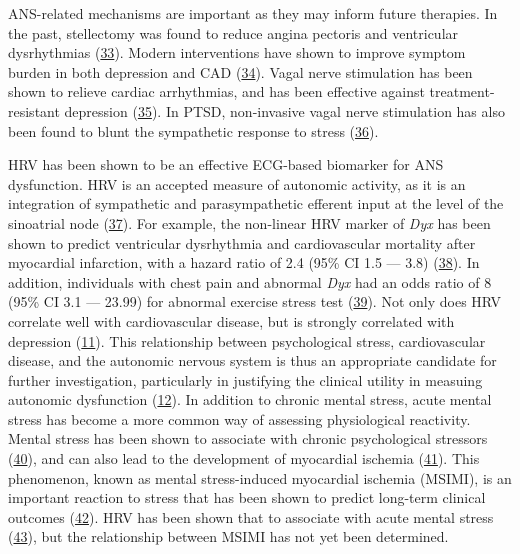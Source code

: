 \documentclass[
  11pt,
  openany]{book}
\begin{document}
ANS-related mechanisms are important as they may inform future therapies.
In the past, stellectomy was found to reduce angina pectoris and ventricular dysrhythmias (\protect\hyperlink{ref-Schwartz2017a}{33}).
Modern interventions have shown to improve symptom burden in both depression and CAD (\protect\hyperlink{ref-Penninx2017}{34}).
Vagal nerve stimulation has been shown to relieve cardiac arrhythmias, and has been effective against treatment-resistant depression (\protect\hyperlink{ref-Zhang2011a}{35}).
In PTSD, non-invasive vagal nerve stimulation has also been found to blunt the sympathetic response to stress (\protect\hyperlink{ref-Gurel2019a}{36}).

HRV has been shown to be an effective ECG-based biomarker for ANS dysfunction.
HRV is an accepted measure of autonomic activity, as it is an integration of sympathetic and parasympathetic efferent input at the level of the sinoatrial node (\protect\hyperlink{ref-Saul1990}{37}).
For example, the non-linear HRV marker of \emph{Dyx} has been shown to predict ventricular dysrhythmia and cardiovascular mortality after myocardial infarction, with a hazard ratio of 2.4 (95\% CI 1.5 --- 3.8) (\protect\hyperlink{ref-Juxf8rgensen2016}{38}).
In addition, individuals with chest pain and abnormal \emph{Dyx} had an odds ratio of 8 (95\% CI 3.1 --- 23.99) for abnormal exercise stress test (\protect\hyperlink{ref-Goldkorn2015b}{39}).
Not only does HRV correlate well with cardiovascular disease, but is strongly correlated with depression (\protect\hyperlink{ref-Stein2000}{11}).
This relationship between psychological stress, cardiovascular disease, and the autonomic nervous system is thus an appropriate candidate for further investigation, particularly in justifying the clinical utility in measuing autonomic dysfunction (\protect\hyperlink{ref-Carney2005}{12}).
In addition to chronic mental stress, acute mental stress has become a more common way of assessing physiological reactivity.
Mental stress has been shown to associate with chronic psychological stressors (\protect\hyperlink{ref-Petrowski2016}{40}), and can also lead to the development of myocardial ischemia (\protect\hyperlink{ref-Arri2016}{41}).
This phenomenon, known as mental stress-induced myocardial ischemia (MSIMI), is an important reaction to stress that has been shown to predict long-term clinical outcomes (\protect\hyperlink{ref-Vaccarino2018}{42}).
HRV has been shown that to associate with acute mental stress (\protect\hyperlink{ref-Castaldo2015}{43}), but the relationship between MSIMI has not yet been determined.
\end{document}

